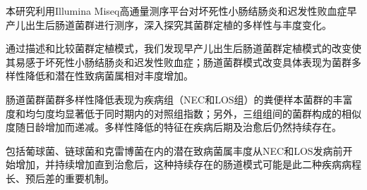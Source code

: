 
\begin{summary}

  本研究利用Illumina Miseq高通量测序平台对坏死性小肠结肠炎和迟发性败血症早产儿出生后肠道菌群进行测序，深入探究其菌群定植的多样性与丰度变化。

  通过描述和比较菌群定植模式，我们发现早产儿出生后肠道菌群定植模式的改变使其易感于坏死性小肠结肠炎和迟发性败血症；肠道菌群模式改变具体表现为菌群多样性降低和潜在性致病菌属相对丰度增加。

  肠道菌群菌群多样性降低表现为疾病组（NEC和LOS组）的粪便样本菌群的丰富度和均匀度均显著低于同时期内的对照组指数；另外，三组组间的菌群构成的相似度随日龄增加而递减。多样性降低的特征在疾病后期及治愈后仍然持续存在。

  包括葡球菌、链球菌和克雷博菌在内的潜在致病菌属丰度从NEC和LOS发病前开始增加，并持续增加直到治愈后，这种持续存在的肠道模式可能是此二种疾病病程长、预后差的重要机制。

\end{summary}
